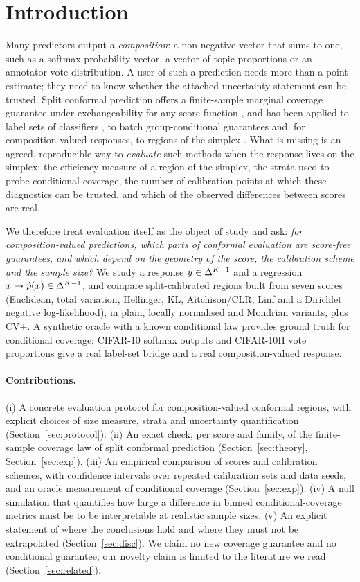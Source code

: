 \section{Introduction}
Many predictors output a \emph{composition}: a non-negative vector that sums to one, such as a softmax probability vector, a vector of topic proportions or an annotator vote distribution. A user of such a prediction needs more than a point estimate; they need to know whether the attached uncertainty statement can be trusted. Split conformal prediction offers a finite-sample marginal coverage guarantee under exchangeability for any score function \citep{angelopoulos2021gentle}, and has been applied to label sets of classifiers \citep{angelopoulos2021raps,ding2023clustered}, to batch group-conditional guarantees \citep{jung2023batch} and, for composition-valued responses, to regions of the simplex \citep{javanmardi2024credal}. What is missing is an agreed, reproducible way to \emph{evaluate} such methods when the response lives on the simplex: the efficiency measure of a region of the simplex, the strata used to probe conditional coverage, the number of calibration points at which these diagnostics can be trusted, and which of the observed differences between scores are real.

We therefore treat evaluation itself as the object of study and ask: \emph{for composition-valued predictions, which parts of conformal evaluation are score-free guarantees, and which depend on the geometry of the score, the calibration scheme and the sample size?} We study a response $y\in\Delta^{K-1}$ and a regression $x\mapsto \hat p(x)\in\Delta^{K-1}$, and compare split-calibrated regions built from seven scores (Euclidean, total variation, Hellinger, KL, Aitchison/CLR, Linf and a Dirichlet negative log-likelihood), in plain, locally normalised and Mondrian variants, plus CV+. A synthetic oracle with a known conditional law provides ground truth for conditional coverage; CIFAR-10 softmax outputs and CIFAR-10H vote proportions give a real label-set bridge and a real composition-valued response.

\paragraph{Contributions.} (i) A concrete evaluation protocol for composition-valued conformal regions, with explicit choices of size measure, strata and uncertainty quantification (Section~\ref{sec:protocol}). (ii) An exact check, per score and family, of the finite-sample coverage law of split conformal prediction (Section~\ref{sec:theory}, Section~\ref{sec:exp}). (iii) An empirical comparison of scores and calibration schemes, with confidence intervals over repeated calibration sets and data seeds, and an oracle measurement of conditional coverage (Section~\ref{sec:exp}). (iv) A null simulation that quantifies how large a difference in binned conditional-coverage metrics must be to be interpretable at realistic sample sizes. (v) An explicit statement of where the conclusions hold and where they must not be extrapolated (Section~\ref{sec:disc}). We claim no new coverage guarantee and no conditional guarantee; our novelty claim is limited to the literature we read (Section~\ref{sec:related}).
